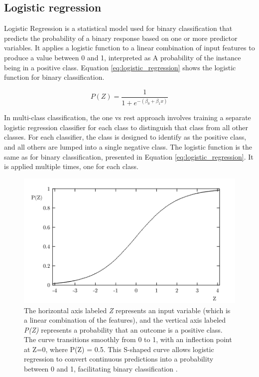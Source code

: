         \newpage

        \subsection{Logistic regression}
            Logistic Regression is a statistical model used for binary classification that predicts the probability of a binary response based on one or more predictor variables. It applies a logistic function to a linear combination of input features to produce a value between 0 and 1, interpreted as A probability of the instance being in a positive class.
            Equation \ref{eq:logistic_regression} shows the logistic function for binary classification.

            \begin{equation} \label{eq:logistic_regression}
                P(Z) = \frac{1}{1 + e^{-(\beta_0 + \beta_1 x)}}
            \end{equation}

            In multi-class classification, the one vs rest approach involves training a separate logistic regression classifier for each class to distinguish that class from all other classes. For each classifier, the class is designed to identify as the positive class, and all others are lumped into a single negative class.
            The logistic function is the same as for binary classification, presented in Equation \ref{eq:logistic_regression}. It is applied multiple times, one for each class.
            
            \begin{figure}[htbp]
                \centering
                \includegraphics[width=.8\textwidth]{../src/resources/images/models/logistic.png}
                \caption{
                    The horizontal axis labeled \textit{Z} represents an input variable (which is a linear combination of the features), and the vertical axis labeled \textit{P(Z)} represents a probability that an outcome is a positive class. The curve transitions smoothly from 0 to 1, with an inflection point at Z=0, where P(Z) = 0.5. This S-shaped curve allows logistic regression to convert continuous predictions into a probability between 0 and 1, facilitating binary classification \cite{cramer_origins_2002}.
                }
                \label{fig:logistic_regression}
            \end{figure}

